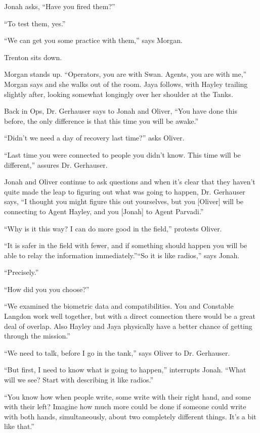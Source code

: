 Jonah asks, ``Have you fired them?''

``To test them, yes.''

``We can get you some practice with them,'' says Morgan.

Trenton sits down.



Morgan stands up.  ``Operators, you are with Swan.  Agents, you are with me,'' Morgan says and she walks out of the room.  Jaya follows, with Hayley trailing slightly after, looking somewhat longingly over her shoulder at the Tanks.



Back in Ops, Dr. Gerhauser says to Jonah and Oliver, ``You have done this before, the only difference is that this time you will be awake.''

``Didn't we need a day of recovery last time?'' asks Oliver.

``Last time you were connected to people you didn't know.  This time will be different,'' assures Dr. Gerhauser.

Jonah and Oliver continue to ask questions and when it's clear that they haven't quite made the leap to figuring out what was going to happen, Dr. Gerhauser says, ``I thought you might figure this out yourselves, but you {[}Oliver{]} will be connecting to Agent Hayley, and you {[}Jonah{]} to Agent Parvadi.''

``Why is it this way?  I can do more good in the field,'' protests Oliver.

``It is safer in the field with fewer, and if something should happen you will be able to relay the information immediately.''``So it is like radios,'' says Jonah.

``Precisely.''

``How did you you choose?''

``We examined the biometric data and compatibilities.  You and Constable Langdon work well together, but with a direct connection there would be a great deal of overlap.  Also Hayley and Jaya physically have a better chance of getting through the mission.''

``We need to talk, before I go in the tank,'' says Oliver to Dr. Gerhauser.

``But first, I need to know what is going to happen,'' interrupts Jonah.  ``What will we see?  Start with describing it like radios.''

``You know how when people write, some write with their right hand, and some with their left?  Imagine how much more could be done if someone could write with both hands, simultaneously, about two completely different things.  It's a bit like that.''

